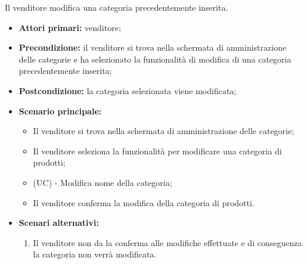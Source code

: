 Il venditore modifica una categoria precedentemente inserita.
\begin{itemize}
    \item \textbf{Attori primari:} venditore;
    \item \textbf{Precondizione:} il venditore si trova nella schermata di amministrazione delle categorie e ha selezionato la funzionalità di modifica di una categoria precedentemente inserita;
    \item \textbf{Postcondizione:} la categoria selezionata viene modificata;
    \item \textbf{Scenario principale:}
    \begin{itemize}
    	\item Il venditore si trova nella schermata di amministrazione delle categorie;
    	\item Il venditore seleziona la funzionalità per modificare una categoria di prodotti;
    	\item (UC) - Modifica nome della categoria;
    	\item Il venditore conferma la modifica della categoria di prodotti.
    \end{itemize}
    \item \textbf{Scenari alternativi:} 
    \begin{enumerate}[label=\lett]
    	\item Il venditore non da la conferma alle modifiche effettuate e di conseguenza la categoria non verrà modificata.
    \end{enumerate}
\end{itemize}

\resetSubUC

